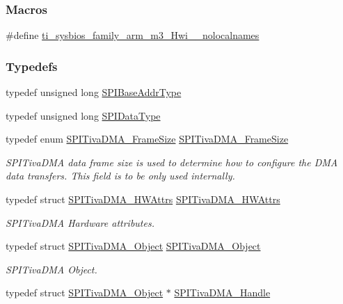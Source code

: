 \subsubsection*{Macros}
\begin{DoxyCompactItemize}
\item 
\#define \hyperlink{_s_p_i_tiva_d_m_a_8h_aaa17ecf48f5762e2e1bdb0bab8aacf0c}{ti\+\_\+sysbios\+\_\+family\+\_\+arm\+\_\+m3\+\_\+\+Hwi\+\_\+\+\_\+nolocalnames}
\end{DoxyCompactItemize}
\subsubsection*{Typedefs}
\begin{DoxyCompactItemize}
\item 
typedef unsigned long \hyperlink{_s_p_i_tiva_d_m_a_8h_a4b7e9f3739f6196bed13f9c3c549c96d}{S\+P\+I\+Base\+Addr\+Type}
\item 
typedef unsigned long \hyperlink{_s_p_i_tiva_d_m_a_8h_ac69c2f2d8cda29733c058bf8e0233af7}{S\+P\+I\+Data\+Type}
\item 
typedef enum \hyperlink{_s_p_i_tiva_d_m_a_8h_a65cb55b42cf383ece69876f50ba2d0a4}{S\+P\+I\+Tiva\+D\+M\+A\+\_\+\+Frame\+Size} \hyperlink{_s_p_i_tiva_d_m_a_8h_ae24d181062a7ee8b005ec1718f52a46e}{S\+P\+I\+Tiva\+D\+M\+A\+\_\+\+Frame\+Size}
\begin{DoxyCompactList}\small\item\em S\+P\+I\+Tiva\+D\+M\+A data frame size is used to determine how to configure the D\+M\+A data transfers. This field is to be only used internally. \end{DoxyCompactList}\item 
typedef struct \hyperlink{struct_s_p_i_tiva_d_m_a___h_w_attrs}{S\+P\+I\+Tiva\+D\+M\+A\+\_\+\+H\+W\+Attrs} \hyperlink{_s_p_i_tiva_d_m_a_8h_ab2566f4cb348d144220085b8fad1dee6}{S\+P\+I\+Tiva\+D\+M\+A\+\_\+\+H\+W\+Attrs}
\begin{DoxyCompactList}\small\item\em S\+P\+I\+Tiva\+D\+M\+A Hardware attributes. \end{DoxyCompactList}\item 
typedef struct \hyperlink{struct_s_p_i_tiva_d_m_a___object}{S\+P\+I\+Tiva\+D\+M\+A\+\_\+\+Object} \hyperlink{_s_p_i_tiva_d_m_a_8h_aa431693a87cbc8cced0555e211d34c2b}{S\+P\+I\+Tiva\+D\+M\+A\+\_\+\+Object}
\begin{DoxyCompactList}\small\item\em S\+P\+I\+Tiva\+D\+M\+A Object. \end{DoxyCompactList}\item 
typedef struct \hyperlink{struct_s_p_i_tiva_d_m_a___object}{S\+P\+I\+Tiva\+D\+M\+A\+\_\+\+Object} $\ast$ \hyperlink{_s_p_i_tiva_d_m_a_8h_a4848d0474d4445327fb598373df1a8e3}{S\+P\+I\+Tiva\+D\+M\+A\+\_\+\+Handle}
\end{DoxyCompactItemize}
